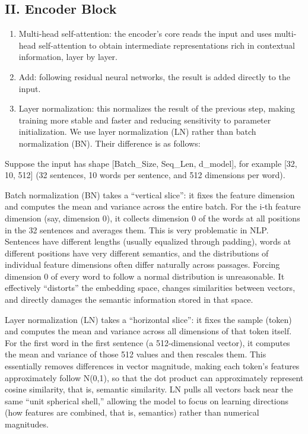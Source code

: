 \hypertarget{ii.-encoder-block}{%
\subsection{II. Encoder Block}\label{ii.-encoder-block}}

\begin{enumerate}
\def\labelenumi{\arabic{enumi}.}
\item
  Multi-head self-attention: the encoder's core reads the input and uses multi-head self-attention to obtain intermediate representations rich in contextual information, layer by layer.
\item
  Add: following residual neural networks, the result is added directly to the input.
\item
  Layer normalization: this normalizes the result of the previous step, making training more stable and faster and reducing sensitivity to parameter initialization. We use layer normalization (LN) rather than batch normalization (BN). Their difference is as follows:
\end{enumerate}

Suppose the input has shape {[}Batch\_Size, Seq\_Len, d\_model{]}, for example {[}32, 10, 512{]} (32 sentences, 10 words per sentence, and 512 dimensions per word).

Batch normalization (BN) takes a ``vertical slice'': it fixes the feature dimension and computes the mean and variance across the entire batch. For the i-th feature dimension (say, dimension 0), it collects dimension 0 of the words at all positions in the 32 sentences and averages them. This is very problematic in NLP. Sentences have different lengths (usually equalized through padding), words at different positions have very different semantics, and the distributions of individual feature dimensions often differ naturally across passages. Forcing dimension 0 of every word to follow a normal distribution is unreasonable. It effectively ``distorts'' the embedding space, changes similarities between vectors, and directly damages the semantic information stored in that space.

Layer normalization (LN) takes a ``horizontal slice'': it fixes the sample (token) and computes the mean and variance across all dimensions of that token itself. For the first word in the first sentence (a 512-dimensional vector), it computes the mean and variance of those 512 values and then rescales them. This essentially removes differences in vector magnitude, making each token's features approximately follow N(0,1), so that the dot product can approximately represent cosine similarity, that is, semantic similarity. LN pulls all vectors back near the same ``unit spherical shell,'' allowing the model to focus on learning directions (how features are combined, that is, semantics) rather than numerical magnitudes.

